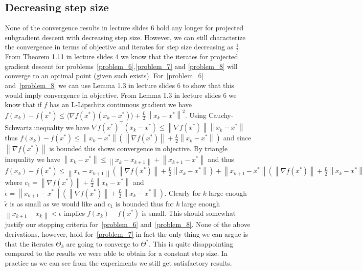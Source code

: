 \documentclass{article}
\newcommand{\0}{\mathrm{0}}
\newcommand{\1}{\mathrm{1}}
\newcommand{\norm}[1]{\left\| #1 \right\|}
\begin{document}
\subsection{Decreasing step size}
None of the convergence results in lecture slides 6 hold any longer for projected subgradient descent with decreasing step size. However, we can still characterize the convergence in terms of objective and iterates for step size decreasing as $\frac{1}{t}$. From Theorem 1.11 in lecture slides 4 we know that the iterates for projected gradient descent for problems~\ref{problem_6},\ref{problem_7} and \ref{problem_8} will converge to an optimal point (given such exists). For~\ref{problem_6} and~\ref{problem_8} we can use Lemma 1.3 in lecture slides 6 to show that this would imply convergence in objective. From Lemma 1.3 in lecture slides 6 we know that if $f$ has an L-Lipschitz continuous gradient we have $f(x_k) - f(x^*) \leq \langle\nabla f(x^*)(x_k-x^*)\rangle + \frac{L}{2}\norm{x_k-x^*}^2$. Using Cauchy-Schwartz inequality we have $\nabla f(x^*)^\top (x_k-x^*) \leq \norm{\nabla f(x^*)}\norm{x_k-x^*}$ thus $f(x_k) - f(x^*) \leq \norm{x_k-x^*}\left(\norm{\nabla f(x^*)} + \frac{L}{2}\norm{x_k-x^*}\right)$ and since $\norm{\nabla f(x^*)}$ is bounded this shows convergence in objective. By triangle inequality we have $\norm{x_k-x^*} \leq \norm{x_k-x_{k+1}} + \norm{x_{k+1} - x^*}$ and thus $f(x_k) - f(x^*) \leq \norm{x_k-x_{k+1}}(\norm{\nabla f(x^*)} + \frac{L}{2}\norm{x_k-x^*}) + \norm{x_{k+1}-x^*}\left(\norm{\nabla f(x^*)} + \frac{L}{2}\norm{x_k-x^*}\right) \leq \norm{x_k-x_{k+1}}c_1 + \tilde{\epsilon}$ where $c_1 = \norm{\nabla f(x^*)}  + \frac{L}{2}\norm{x_k-x^*}$ and $\tilde{\epsilon} = \norm{x_{k+1}-x^*}\left(\norm{\nabla f(x^*)} + \frac{L}{2}\norm{x_k-x^*}\right)$. Clearly for $k$ large enough $\tilde{\epsilon}$ is as small as we would like and $c_1$ is bounded thus for $k$ large enough $\norm{x_{k+1} - x_k} < \epsilon$ implies $f(x_k) - f(x^*)$ is small. This should somewhat justify our stopping criteria for~\ref{problem_6} and~\ref{problem_8}. None of the above derivations, however, hold for~\ref{problem_7} in fact the only thing we can argue is that the iterates $\Theta_k$ are going to converge to $\Theta^*$. This is quite disappointing compared to the results we were able to obtain for a constant step size. In practice as we can see from the experiments we still get satisfactory results.
\end{document}
